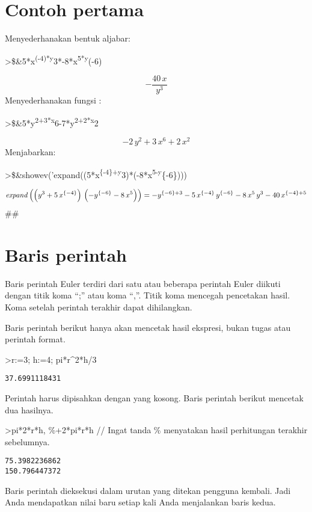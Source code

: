 \documentclass[
]{book}
\begin{document}
\section{Contoh pertama}\label{contoh-pertama}

Menyederhanakan bentuk aljabar:

\textgreater\$\&5*x\textsuperscript{(-4)*y}3*-8*x\textsuperscript{5*y}(-6)

\[-\frac{40\,x}{y^3}\]Menyederhanakan fungsi :

\textgreater\$\&5*y\textsuperscript{2+3*x}6-7*y\textsuperscript{2+2*x}2

\[-2\,y^2+3\,x^6+2\,x^2\]Menjabarkan:

\textgreater\$\&showev('expand((5*x\textsuperscript{\{-4\}+y}3)*(-8*x\textsuperscript{5-y}\{-6\})))

\[{\it expand}\left(\left(y^3+5\,x^{\left \{-4 \right \}}\right)\,
 \left(-y^{\left \{-6 \right \}}-8\,x^5\right)\right)=-y^{\left \{-6
  \right \}+3}-5\,x^{\left \{-4 \right \}}\,y^{\left \{-6 \right \}}-
 8\,x^5\,y^3-40\,x^{\left \{-4 \right \}+5}\]\#\#

\section{Baris perintah}\label{baris-perintah}

Baris perintah Euler terdiri dari satu atau beberapa perintah Euler diikuti dengan titik koma ``;'' atau koma ``,''. Titik koma mencegah pencetakan hasil. Koma setelah perintah terakhir dapat dihilangkan.

Baris perintah berikut hanya akan mencetak hasil ekspresi, bukan tugas atau perintah format.

\textgreater r:=3; h:=4; pi*r\^{}2*h/3

\begin{verbatim}
37.6991118431
\end{verbatim}

Perintah harus dipisahkan dengan yang kosong. Baris perintah berikut mencetak dua hasilnya.

\textgreater pi*2*r*h, \%+2*pi*r*h // Ingat tanda \% menyatakan hasil perhitungan terakhir sebelumnya.

\begin{verbatim}
75.3982236862
150.796447372
\end{verbatim}

Baris perintah dieksekusi dalam urutan yang ditekan pengguna kembali. Jadi Anda mendapatkan nilai baru setiap kali Anda menjalankan baris kedua.
\end{document}
